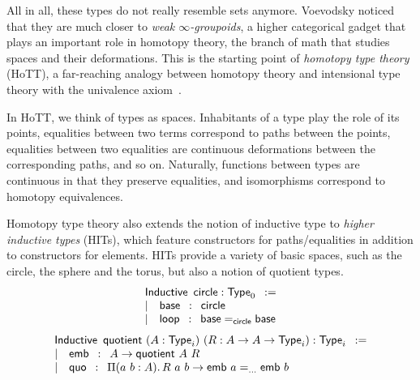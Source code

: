 All in all, these types do not really resemble sets anymore. 
% 
Voevodsky noticed that they are much closer to \emph{weak \( \infty \)-groupoids}, 
a higher categorical gadget that plays an important role in homotopy theory, 
the branch of math that studies spaces and their deformations.
% 
This is the starting point of \emph{homotopy type theory} (HoTT), a far-reaching analogy
between homotopy theory and intensional type theory with the univalence 
axiom~\cite{hottbook}.

In HoTT, we think of types as spaces. Inhabitants of a type 
play the role of its points, equalities between two terms correspond to paths
between the points, equalities between two equalities are continuous
deformations between the corresponding paths, and so on. 
% 
Naturally, functions between types are continuous in that they preserve
equalities, and isomorphisms correspond to homotopy equivalences.

Homotopy type theory also extends the notion of inductive type to 
\emph{higher inductive types} (HITs), which feature constructors for paths/equalities
in addition to constructors for elements.
% 
HITs provide a variety of basic spaces, such as the circle, the sphere and
the torus, but also a notion of quotient types.
% 
\[
\begin{array}{l}
\mathsf{Inductive}\enskip\mathsf{circle} : \varType_0\enskip := \\
\sep \quad \mathsf{base} \enskip : \enskip \mathsf{circle}\\
\sep \quad \mathsf{loop} \enskip : \enskip \Indeq{\mathsf{circle}}{\mathsf{base}}{\mathsf{base}} \\
\end{array}
\]
\[
\begin{array}{l}
\mathsf{Inductive}\enskip\mathsf{quotient}\ (A : \varType_i)\ (R : A \to A \to \varType_i) : \varType_i\enskip := \\
\sep \quad \mathsf{emb} \enskip : \enskip A \to \mathsf{quotient}\ A\ R \\
\sep \quad \mathsf{quo} \enskip : \enskip \Depfun[a\ b]{A}{R\ a\ b \to \Indeq{...}{\mathsf{emb}\ a}{\mathsf{emb}\ b}} \\
\end{array}
\]

